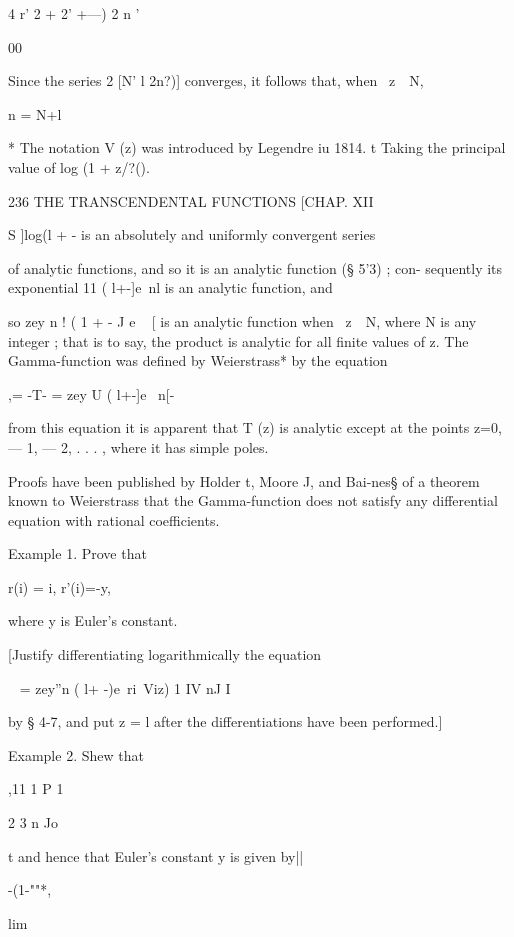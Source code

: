  4 r' 2 + 2' +---) 2 n '

00

Since the series 2 [N' l 2n?)] converges, it follows that, when \ z\ \
N,

n = N+l

* The notation V (z) was introduced by Legendre iu 1814. t Taking the
principal value of log (1 + z/?().



236 THE TRANSCENDENTAL FUNCTIONS [CHAP. XII

S ]log(l + - is an absolutely and uniformly convergent series

of analytic functions, and so it is an analytic function (§ 5'3) ;
con- sequently its exponential 11 ( l+-]e~nl is an analytic function,
and

so zey n ! ( 1 + - J e ~ [ is an analytic function when \ z\ \ N,
where N is any integer ; that is to say, the product is analytic for
all finite values of z. The Gamma-function was defined by Weierstrass*
by the equation

,= -T- = zey U ( l+-]e ~n[-

from this equation it is apparent that T (z) is analytic except at the
points z=0, — 1, — 2, . . . , where it has simple poles.

Proofs have been published by Holder t, Moore J, and Bai-nes§ of a
theorem known to Weierstrass that the Gamma-function does not satisfy
any differential equation with rational coefficients.

Example 1. Prove that

r(i) = i, r'(i)=-y,

where y is Euler's constant.

[Justify differentiating logarithmically the equation

~ = zey''n ( l+ -)e~ri\ Viz) 1 IV nJ I

by § 4-7, and put z = l after the differentiations have been
performed.]

Example 2. Shew that



,11 1 P 1

2 3 n Jo



t and hence that Euler's constant y is given by||



-(1-""*,



lim



